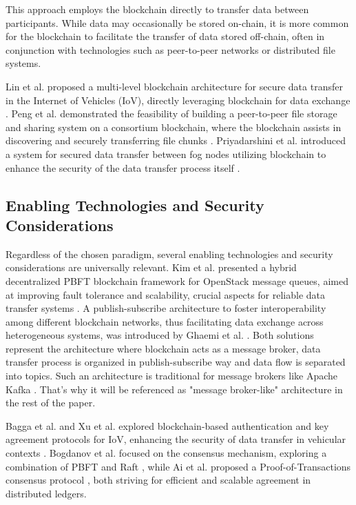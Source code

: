 \documentclass[10pt]{llncs}
\begin{document}
This approach employs the blockchain directly to transfer data between participants.
While data may occasionally be stored on-chain, it is more common for the blockchain to facilitate the transfer of data stored off-chain,
 often in conjunction with technologies such as peer-to-peer networks or distributed file systems.

Lin et al. proposed a multi-level blockchain architecture for secure data transfer in the Internet of Vehicles (IoV), 
directly leveraging blockchain for data exchange \cite{Lin2023}. 
Peng et al. demonstrated the feasibility of building a peer-to-peer file storage and sharing system on a consortium blockchain, 
where the blockchain assists in discovering and securely transferring file chunks \cite{Peng2023}. 
Priyadarshini et al. introduced a system for secured data transfer between fog nodes utilizing blockchain to enhance the security of 
the data transfer process itself \cite{Priyadarshini2021}.

\subsection{Enabling Technologies and Security Considerations}

Regardless of the chosen paradigm, several enabling technologies and security considerations are universally relevant. 
Kim et al. presented a hybrid decentralized PBFT blockchain framework for OpenStack message queues, aimed at improving fault tolerance and scalability, 
crucial aspects for reliable data transfer systems \cite{kim2020hybrid}. 
A publish-subscribe architecture to foster interoperability among different blockchain networks, thus facilitating data exchange across heterogeneous systems, was introduced by Ghaemi et al. \cite{Ghaemi2021}. 
Both solutions represent the architecture where blockchain acts as a message broker, data transfer process is organized in publish-subscribe way and data flow is separated into topics. 
Such an architecture is traditional for message brokers like Apache Kafka \cite{apachekafka}.
That's why it will be referenced as "message broker-like" architecture in the rest of the paper.

Bagga et al. and Xu et al. explored blockchain-based authentication and key agreement protocols for IoV, enhancing the security of data transfer in vehicular contexts \cite{Bagga2021,Xu2021}. 
Bogdanov et al. focused on the consensus mechanism, exploring a combination of PBFT and Raft \cite{Bogdanov2024}, while Ai et al. proposed a Proof-of-Transactions consensus protocol \cite{Ai2022}, 
both striving for efficient and scalable agreement in distributed ledgers. 
\end{document}
